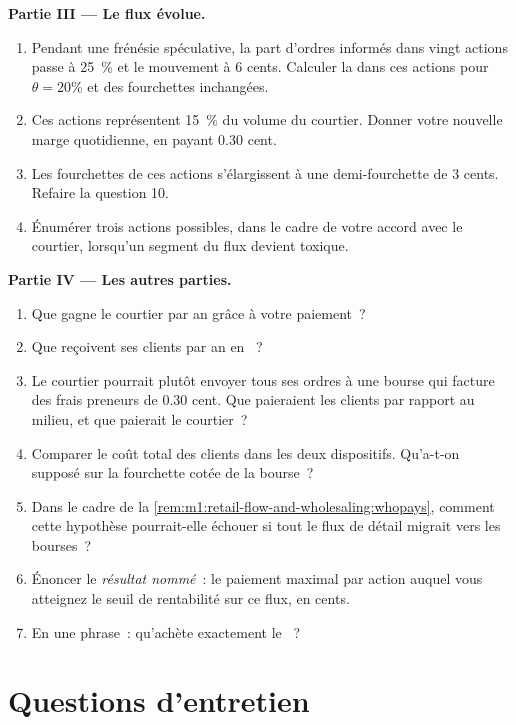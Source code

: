 \begin{problem}
\medskip\noindent\textbf{Partie III --- Le flux évolue.}
\begin{enumerate}[resume]
\item Pendant une frénésie spéculative, la part d'ordres informés dans vingt
actions passe à 25~\% et le mouvement à 6 cents. Calculer la
 dans ces actions pour $\theta = 20\%$ et des fourchettes inchangées.
\item Ces actions représentent 15~\% du volume du courtier. Donner votre nouvelle marge
quotidienne, en payant 0.30 cent.
\item Les fourchettes de ces actions s'élargissent à une demi-fourchette de 3 cents. Refaire la
question 10.
\item Énumérer trois actions possibles, dans le cadre de votre accord avec le courtier,
lorsqu'un segment du flux devient toxique.
\end{enumerate}

\medskip\noindent\textbf{Partie IV --- Les autres parties.}
\begin{enumerate}[resume]
\item Que gagne le courtier par an grâce à votre paiement~?
\item Que reçoivent ses clients par an en ~?
\item Le courtier pourrait plutôt envoyer tous ses ordres à une bourse qui facture
des frais preneurs de 0.30 cent. Que paieraient les clients par rapport au milieu, et
que paierait le courtier~?
\item Comparer le coût total des clients dans les deux dispositifs.
Qu'a-t-on supposé sur la fourchette cotée de la bourse~?
\item Dans le cadre de la \cref{rem:m1:retail-flow-and-wholesaling:whopays}, comment cette
hypothèse pourrait-elle échouer si tout le flux de détail migrait vers les bourses~?
\item Énoncer le \emph{résultat nommé}~: le paiement maximal par action auquel
vous atteignez le seuil de rentabilité sur ce flux, en cents.
\item En une phrase~: qu'achète exactement le ~?
\end{enumerate}
\end{problem}

\section{Questions d'entretien}

